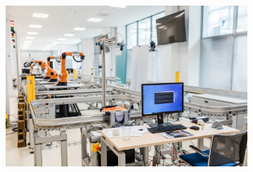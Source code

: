 \documentclass[xcolor=dvipsnames,envcountsect]{beamer}
\begin{document}
\begin{frame}
\begin{figure}
\begin{subfigure}[b]{0.3\textwidth}
     \end{subfigure}
     \vfill
     \begin{subfigure}[b]{0.2\textwidth}
         \centering
         \includegraphics[width=\textwidth]{Figures/ciirc.jpg}
     \end{subfigure}
\end{figure}
\end{frame}



\end{document}
